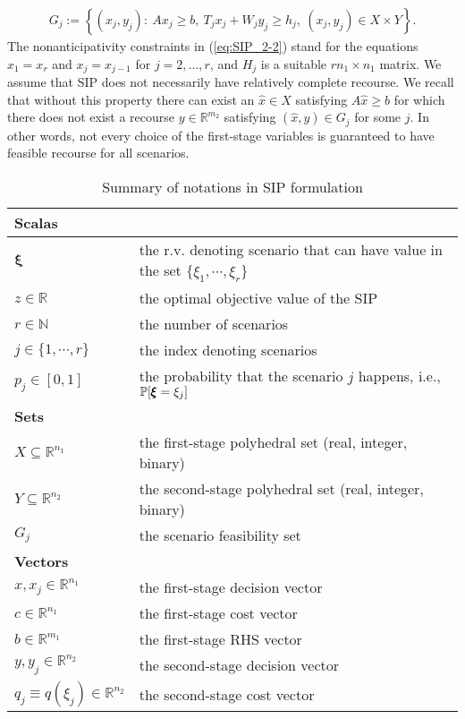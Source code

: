 \begin{align}
G_j:=\left\{ (x_j,y_j): \ Ax_j\ge b,\  T_j x_j+W_j y_j\ge h_j,\ (x_j,y_j)\in X\times Y  \right\}.
\end{align}
The nonanticipativity constraints in (\ref{eq:SIP_2-2}) stand for the equations $x_1=x_r$ and $x_j=x_{j-1}$ for $j=2,\ldots,r$, and $H_j$ is a suitable $rn_1\times n_1$ matrix. We assume that SIP does not necessarily have relatively complete recourse. We recall that without this property there can exist an $\hat{x}\in X$ satisfying $A\hat{x}\ge b$ for which there does not exist a recourse $y\in\mathbb{R}^{m_2}$ satisfying $(\hat{x},y)\in G_j$ for some $j$. In other words, not every choice of the first-stage variables is guaranteed to have feasible recourse for all scenarios.
\begin{table}[H]
	\caption{Summary of notations in SIP formulation}
	\label{notation:SIP}
	\resizebox{\textwidth}{!}
	{
		\begin{tabular}{ll}
			\toprule
			\textbf{Scalas}	&	\\  \midrule
			$\pmb{\xi}$	&	the r.v. denoting scenario that can have value in the set $\{\xi_1,\cdots,\xi_r\}$ 	\\			
			$z\in\mathbb{R}$ & the optimal objective value of the SIP \\ 
			$r\in\mathbb{N}$	&	the number of scenarios	\\	
			$j\in\{1,\cdots,r\}$	&	the index denoting scenarios	\\
			$p_j\in[0,1]$ & the probability that the scenario $j$ happens, i.e., $\operatorname*{\mathbb{P}}[\pmb{\xi}=\xi_j]$ \\ \midrule
			\textbf{Sets} &  \\  \midrule
			$X\subseteq\mathbb{R}^{n_1}$	&	the first-stage polyhedral set (real, integer, binary)\\
			$Y\subseteq\mathbb{R}^{n_2}$	&	the second-stage polyhedral set (real, integer, binary)\\
			$G_j$	& the scenario feasibility set\\ \midrule
			\textbf{Vectors} &   \\  \midrule
			$x,x_j\in\mathbb{R}^{n_1}$	&	the first-stage decision vector	\\
			$c\in \mathbb{R}^{n_1}$	& the first-stage cost vector\\
			$b\in\mathbb{R}^{m_1}$	& the first-stage RHS vector\\
			$y,y_j\in\mathbb{R}^{n_2}$	& the second-stage decision vector	\\
			$q_j\equiv q(\xi_j)\in\mathbb{R}^{n_2}$	& the second-stage cost vector \\

\end{tabular}}
\end{table}
